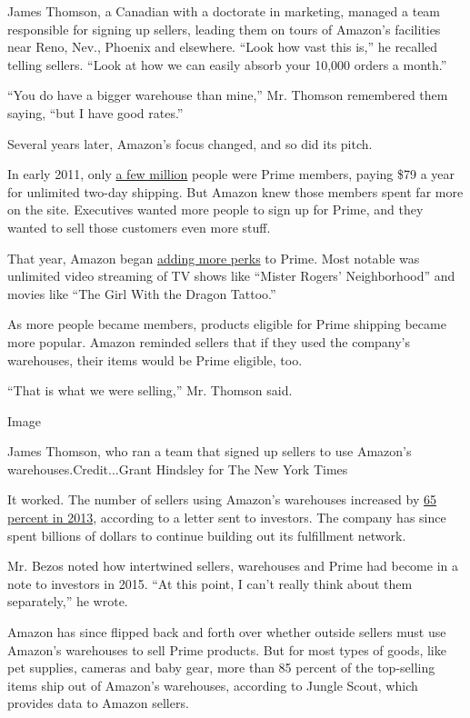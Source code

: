 James Thomson, a Canadian with a doctorate in marketing, managed a team
responsible for signing up sellers, leading them on tours of Amazon's
facilities near Reno, Nev., Phoenix and elsewhere. ``Look how vast this
is,'' he recalled telling sellers. ``Look at how we can easily absorb
your 10,000 orders a month.''

``You do have a bigger warehouse than mine,'' Mr. Thomson remembered
them saying, ``but I have good rates.''

Several years later, Amazon's focus changed, and so did its pitch.

In early 2011, only
\href{https://www.geekwire.com/2013/amazon-prime-10m-members-counting/}{a
few million} people were Prime members, paying \$79 a year for unlimited
two-day shipping. But Amazon knew those members spent far more on the
site. Executives wanted more people to sign up for Prime, and they
wanted to sell those customers even more stuff.

That year, Amazon began
\href{https://www.vox.com/recode/2019/5/3/18511544/amazon-prime-oral-history-jeff-bezos-one-day-shipping}{adding
more perks} to Prime. Most notable was unlimited video streaming of TV
shows like ``Mister Rogers' Neighborhood'' and movies like ``The Girl
With the Dragon Tattoo.''

As more people became members, products eligible for Prime shipping
became more popular. Amazon reminded sellers that if they used the
company's warehouses, their items would be Prime eligible, too.

``That is what we were selling,'' Mr. Thomson said.

Image

James Thomson, who ran a team that signed up sellers to use Amazon's
warehouses.Credit...Grant Hindsley for The New York Times

It worked. The number of sellers using Amazon's warehouses increased by
\href{https://www.sec.gov/Archives/edgar/data/1018724/000119312514137753/d702518dex991.htm}{65
percent in 2013}, according to a letter sent to investors. The company
has since spent billions of dollars to continue building out its
fulfillment network.

Mr. Bezos noted how intertwined sellers, warehouses and Prime had become
in a note to investors in 2015. ``At this point, I can't really think
about them separately,'' he wrote.

Amazon has since flipped back and forth over whether outside sellers
must use Amazon's warehouses to sell Prime products. But for most types
of goods, like pet supplies, cameras and baby gear, more than 85 percent
of the top-selling items ship out of Amazon's warehouses, according to
Jungle Scout, which provides data to Amazon sellers.

